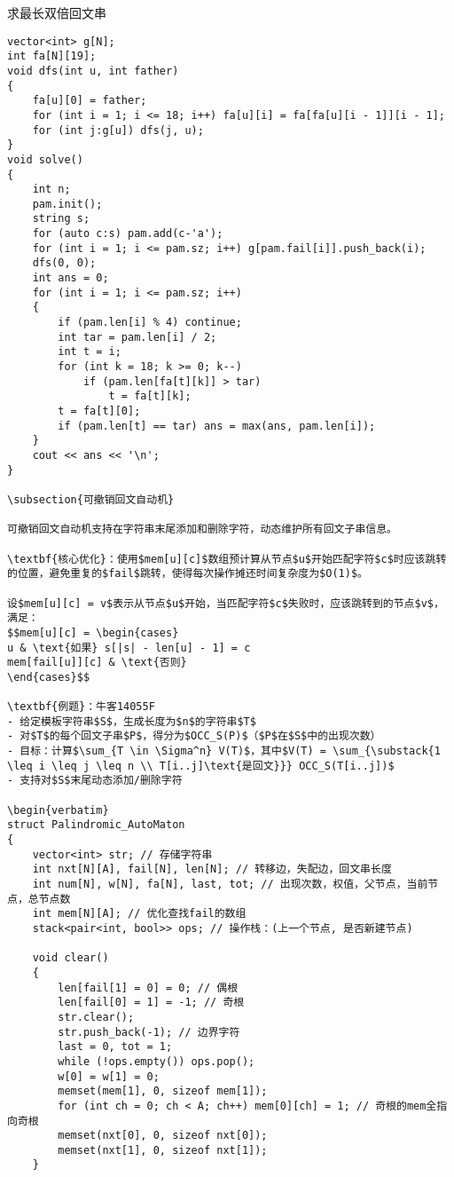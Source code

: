\documentclass[a4paper, fontset=none]{ctexart}
\begin{document}
求最长双倍回文串

\begin{verbatim}
vector<int> g[N];
int fa[N][19];
void dfs(int u, int father)
{
    fa[u][0] = father;
    for (int i = 1; i <= 18; i++) fa[u][i] = fa[fa[u][i - 1]][i - 1];
    for (int j:g[u]) dfs(j, u);
}
void solve()
{
    int n;
    pam.init();
    string s;
    for (auto c:s) pam.add(c-'a');
    for (int i = 1; i <= pam.sz; i++) g[pam.fail[i]].push_back(i);
    dfs(0, 0);
    int ans = 0;
    for (int i = 1; i <= pam.sz; i++)
    {
        if (pam.len[i] % 4) continue;
        int tar = pam.len[i] / 2;
        int t = i;
        for (int k = 18; k >= 0; k--)
            if (pam.len[fa[t][k]] > tar)
                t = fa[t][k];
        t = fa[t][0];
        if (pam.len[t] == tar) ans = max(ans, pam.len[i]);
    }
    cout << ans << '\n';
}

\subsection{可撤销回文自动机}

可撤销回文自动机支持在字符串末尾添加和删除字符，动态维护所有回文子串信息。

\textbf{核心优化}：使用$mem[u][c]$数组预计算从节点$u$开始匹配字符$c$时应该跳转的位置，避免重复的$fail$跳转，使得每次操作摊还时间复杂度为$O(1)$。

设$mem[u][c] = v$表示从节点$u$开始，当匹配字符$c$失败时，应该跳转到的节点$v$，满足：
$$mem[u][c] = \begin{cases}
u & \text{如果} s[|s| - len[u] - 1] = c
mem[fail[u]][c] & \text{否则}
\end{cases}$$

\textbf{例题}：牛客14055F
- 给定模板字符串$S$，生成长度为$n$的字符串$T$
- 对$T$的每个回文子串$P$，得分为$OCC_S(P)$（$P$在$S$中的出现次数）
- 目标：计算$\sum_{T \in \Sigma^n} V(T)$，其中$V(T) = \sum_{\substack{1 \leq i \leq j \leq n \\ T[i..j]\text{是回文}}} OCC_S(T[i..j])$
- 支持对$S$末尾动态添加/删除字符

\begin{verbatim}
struct Palindromic_AutoMaton
{
    vector<int> str; // 存储字符串
    int nxt[N][A], fail[N], len[N]; // 转移边，失配边，回文串长度
    int num[N], w[N], fa[N], last, tot; // 出现次数，权值，父节点，当前节点，总节点数
    int mem[N][A]; // 优化查找fail的数组
    stack<pair<int, bool>> ops; // 操作栈：(上一个节点, 是否新建节点)

    void clear()
    {
        len[fail[1] = 0] = 0; // 偶根
        len[fail[0] = 1] = -1; // 奇根
        str.clear();
        str.push_back(-1); // 边界字符
        last = 0, tot = 1;
        while (!ops.empty()) ops.pop();
        w[0] = w[1] = 0;
        memset(mem[1], 0, sizeof mem[1]);
        for (int ch = 0; ch < A; ch++) mem[0][ch] = 1; // 奇根的mem全指向奇根
        memset(nxt[0], 0, sizeof nxt[0]);
        memset(nxt[1], 0, sizeof nxt[1]);
    }


\end{verbatim}
\end{document}
